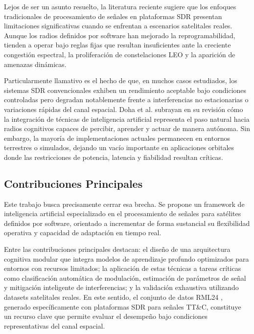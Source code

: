 Lejos de ser un asunto resuelto, la literatura reciente sugiere que los enfoques tradicionales de procesamiento de señales en plataformas SDR presentan limitaciones significativas cuando se enfrentan a escenarios satelitales reales. Aunque los radios definidos por software han mejorado la reprogramabilidad, tienden a operar bajo reglas fijas que resultan insuficientes ante la creciente congestión espectral, la proliferación de constelaciones LEO y la aparición de amenazas dinámicas.

Particularmente llamativo es el hecho de que, en muchos casos estudiados, los sistemas SDR convencionales exhiben un rendimiento aceptable bajo condiciones controladas pero degradan notablemente frente a interferencias no estacionarias o variaciones rápidas del canal espacial. Doha et al. \cite{Doha2026} subrayan en su revisión cómo la integración de técnicas de inteligencia artificial representa el paso natural hacia radios cognitivos capaces de percibir, aprender y actuar de manera autónoma. Sin embargo, la mayoría de implementaciones actuales permanecen en entornos terrestres o simulados, dejando un vacío importante en aplicaciones orbitales donde las restricciones de potencia, latencia y fiabilidad resultan críticas.

\subsection{Contribuciones Principales}

Este trabajo busca precisamente cerrar esa brecha. Se propone un framework de inteligencia artificial especializado en el procesamiento de señales para satélites definidos por software, orientado a incrementar de forma sustancial su flexibilidad operativa y capacidad de adaptación en tiempo real.

Entre las contribuciones principales destacan: el diseño de una arquitectura cognitiva modular que integra modelos de aprendizaje profundo optimizados para entornos con recursos limitados; la aplicación de estas técnicas a tareas críticas como clasificación automática de modulación, estimación de parámetros de señal y mitigación inteligente de interferencias; y la validación exhaustiva utilizando datasets satelitales reales. En este sentido, el conjunto de datos RML24 \cite{Zhang2026}, generado específicamente con plataformas SDR para señales TT\&C, constituye un recurso clave que permite evaluar el desempeño bajo condiciones representativas del canal espacial.

